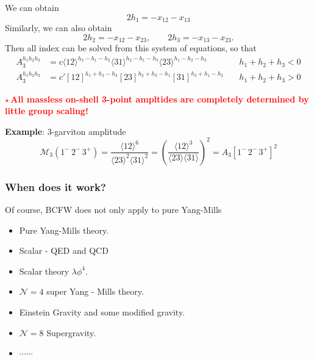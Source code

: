 \documentclass{beamer}
\newcommand{\avg}[1]{\langle #1 \rangle}
\newcommand{\mdavg}[2]{\langle #1 \rangle\!\langle #2 \rangle}
\begin{document}
\begin{frame}
    We can obtain
    \begin{equation*}
        2h_1=-x_{12}-x_{13}
    \end{equation*}
    Similarly, we can also obtain
    \begin{equation*}
        2h_2=-x_{12}-x_{23},\qquad 2h_3=-x_{13}-x_{23}.
    \end{equation*}
    Then all index can be solved from this system of equations, so that
    \[
    \boxed{
    \begin{aligned}
        A_3^{h_1h_2h_3} &= c\avg{12}^{h_3-h_1-h_2}\avg{31}^{h_2-h_1-h_3}\avg{23}^{h_1-h_2-h_3}
        \quad & h_1+h_2+h_3 < 0 \\[0.5em]
        A_3^{h_1h_2h_3} &= c' [12]^{h_1+h_2-h_3}[23]^{h_2+h_3-h_1}[31]^{h_3+h_1-h_2}
        \quad & h_1+h_2+h_3 > 0
    \end{aligned}
        }
    \]

    \textbf{\textcolor{red}{$\star$\,All massless on-shell 3-point ampltides are completely determined by little group scaling!}}
    
    \textbf{Example}: 3-garviton amplitude\\
    \begin{equation*}
        \mathcal{M}_3(1^-\, 2^-\, 3^+) = \frac{\langle 12 \rangle^6}{\langle 23 \rangle^2 \langle 31 \rangle^2} = \left(\frac{\avg{12}^3}{\mdavg{23}{31}}\right)^2=A_3[1^-\, 2^-\, 3^+]^2
    \end{equation*}
    \end{frame}

\begin{frame}
    \frametitle{When does it work?}
    Of course, BCFW does not only apply to pure Yang-Mills
    \begin{itemize}
        \item Pure Yang-Mills theory.
        \item Scalar - QED and QCD
        \item Scalar theory $\lambda \phi^4$.
        \item $\mathcal{N} =4$ super Yang - Mills theory.
        \item Einstein Gravity and some modified gravity.
        \item $\mathcal{N}=8$ Supergravity.
        \item $\cdots\cdots$
    \end{itemize}
\end{frame}
\end{document}
